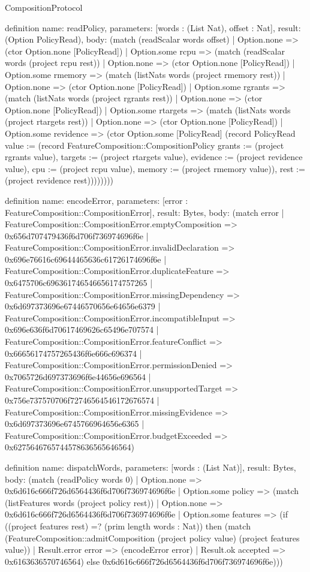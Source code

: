 \begin{lexlean}{CompositionProtocol}
\begin{semanticmodule}
definition{
  name: readPolicy,
  parameters: [words : (List Nat), offset : Nat],
  result: (Option PolicyRead),
  body: (match (readScalar words offset)
    | Option.none => (ctor Option.none [PolicyRead])
    | Option.some rcpu => (match (readScalar words (project rcpu rest))
      | Option.none => (ctor Option.none [PolicyRead])
      | Option.some rmemory => (match (listNats words (project rmemory rest))
        | Option.none => (ctor Option.none [PolicyRead])
        | Option.some rgrants => (match (listNats words (project rgrants rest))
          | Option.none => (ctor Option.none [PolicyRead])
          | Option.some rtargets => (match (listNats words (project rtargets rest))
            | Option.none => (ctor Option.none [PolicyRead])
            | Option.some revidence => (ctor Option.some [PolicyRead] (record PolicyRead {value := (record FeatureComposition::CompositionPolicy {grants := (project rgrants value), targets := (project rtargets value), evidence := (project revidence value), cpu := (project rcpu value), memory := (project rmemory value)}), rest := (project revidence rest)})))))))
}

definition{
  name: encodeError,
  parameters: [error : FeatureComposition::CompositionError],
  result: Bytes,
  body: (match error
    | FeatureComposition::CompositionError.emptyComposition => 0x656d707479436f6d706f736974696f6e
    | FeatureComposition::CompositionError.invalidDeclaration => 0x696e76616c69644465636c61726174696f6e
    | FeatureComposition::CompositionError.duplicateFeature => 0x6475706c696361746546656174757265
    | FeatureComposition::CompositionError.missingDependency => 0x6d697373696e67446570656e64656e6379
    | FeatureComposition::CompositionError.incompatibleInput => 0x696e636f6d70617469626c65496e707574
    | FeatureComposition::CompositionError.featureConflict => 0x66656174757265436f6e666c696374
    | FeatureComposition::CompositionError.permissionDenied => 0x7065726d697373696f6e44656e696564
    | FeatureComposition::CompositionError.unsupportedTarget => 0x756e737570706f72746564546172676574
    | FeatureComposition::CompositionError.missingEvidence => 0x6d697373696e6745766964656e6365
    | FeatureComposition::CompositionError.budgetExceeded => 0x6275646765744578636565646564)
}

definition{
  name: dispatchWords,
  parameters: [words : (List Nat)],
  result: Bytes,
  body: (match (readPolicy words 0)
    | Option.none => 0x6d616c666f726d6564436f6d706f736974696f6e
    | Option.some policy => (match (listFeatures words (project policy rest))
      | Option.none => 0x6d616c666f726d6564436f6d706f736974696f6e
      | Option.some features => (if ((project features rest) =? (prim length words : Nat)) then (match (FeatureComposition::admitComposition (project policy value) (project features value))
        | Result.error error => (encodeError error)
        | Result.ok accepted => 0x6163636570746564) else 0x6d616c666f726d6564436f6d706f736974696f6e)))
}


\end{semanticmodule}
\end{lexlean}
